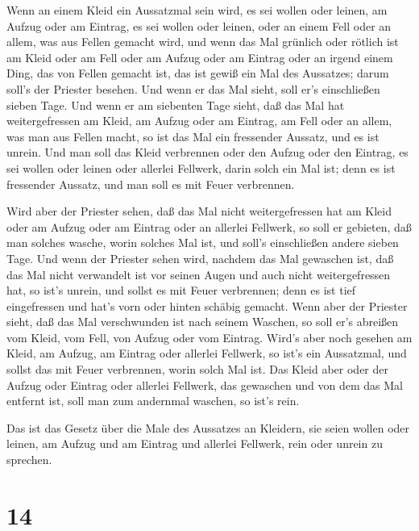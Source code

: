  Wenn an einem Kleid ein Aussatzmal sein wird, es sei
wollen oder leinen,  am Aufzug oder am Eintrag, es sei
wollen oder leinen, oder an einem Fell oder an allem, was aus Fellen
gemacht wird,  und wenn das Mal grünlich oder rötlich ist
am Kleid oder am Fell oder am Aufzug oder am Eintrag oder an irgend
einem Ding, das von Fellen gemacht ist, das ist gewiß ein Mal des
Aussatzes; darum soll's der Priester besehen.  Und wenn er
das Mal sieht, soll er's einschließen sieben Tage.  Und
wenn er am siebenten Tage sieht, daß das Mal hat weitergefressen am
Kleid, am Aufzug oder am Eintrag, am Fell oder an allem, was man aus
Fellen macht, so ist das Mal ein fressender Aussatz, und es ist unrein.
 Und man soll das Kleid verbrennen oder den Aufzug oder den
Eintrag, es sei wollen oder leinen oder allerlei Fellwerk, darin solch
ein Mal ist; denn es ist fressender Aussatz, und man soll es mit Feuer
verbrennen.

 Wird aber der Priester sehen, daß das Mal nicht
weitergefressen hat am Kleid oder am Aufzug oder am Eintrag oder an
allerlei Fellwerk,  so soll er gebieten, daß man solches
wasche, worin solches Mal ist, und soll's einschließen andere sieben
Tage.  Und wenn der Priester sehen wird, nachdem das Mal
gewaschen ist, daß das Mal nicht verwandelt ist vor seinen Augen und
auch nicht weitergefressen hat, so ist's unrein, und sollst es mit Feuer
verbrennen; denn es ist tief eingefressen und hat's vorn oder hinten
schäbig gemacht.  Wenn aber der Priester sieht, daß das Mal
verschwunden ist nach seinem Waschen, so soll er's abreißen vom Kleid,
vom Fell, von Aufzug oder vom Eintrag.  Wird's aber noch
gesehen am Kleid, am Aufzug, am Eintrag oder allerlei Fellwerk, so ist's
ein Aussatzmal, und sollst das mit Feuer verbrennen, worin solch Mal
ist.  Das Kleid aber oder der Aufzug oder Eintrag oder
allerlei Fellwerk, das gewaschen und von dem das Mal entfernt ist, soll
man zum andernmal waschen, so ist's rein.

 Das ist das Gesetz über die Male des Aussatzes an
Kleidern, sie seien wollen oder leinen, am Aufzug und am Eintrag und
allerlei Fellwerk, rein oder unrein zu sprechen.

\hypertarget{section-13}{%
\section{14}\label{section-13}}

